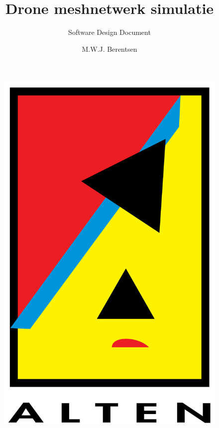 \documentclass[a4paper, 11pt, oneside]{report}
\author{M.W.J. Berentsen}
\title{\myfont Drone meshnetwerk simulatie}
\subtitle{Software Design Document}{HAN Arnhem}{561399}{MWJ.Berentsen@student.han.nl}{Versie 1}{Alten Nederland B.V.}{Docent: J. Visch, MSc}{Assessor: ir. C.G.R. van Uffelen}
\begin{document}
\begin{figure}
	\begin{center}\includegraphics[scale=0.1]{alten}\end{center}
\end{figure}
\maketitle

\end{document}
